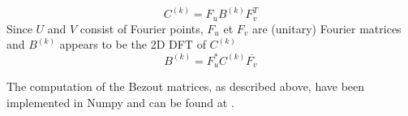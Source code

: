 \documentclass{standalone}
\begin{document}
\begin{enumerate}
\begin{equation}
C^{(k)} = F_uB^{(k)} F_v^T
 \end{equation}
Since $U$ and $V$ consist of Fourier points, $F_u$ et $F_v$ are (unitary) Fourier matrices and $B^{(k)}$ appears to be the 2D DFT of $C^{(k)}$
 \begin{equation}
 B^{(k)} = F_u^*C^{(k)} \overline{F_v}
 \end{equation}
\end{enumerate}
The computation of the Bezout matrices, as described above, have been implemented in Numpy and can be found at \cite{jp_code}.
\end{document}
